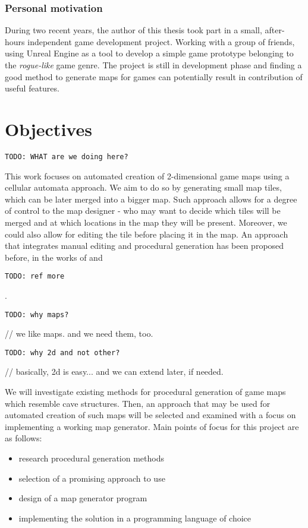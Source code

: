 \documentclass[12pt]{report}
\newcommand{\todo}[1]{}
\renewcommand{\todo}[1]{{\color{red} \par \noindent \footnotesize \texttt{TODO: {#1} }}}
\begin{document}
\subsubsection{Personal motivation}
During two recent years, the author of this thesis took part in a small, after-hours independent game development project. Working with a group of friends, using Unreal Engine as a tool to develop a simple game prototype belonging to the \textit{rogue-like} game genre. The project is still in development phase and finding a good method to generate maps for games can potentially result in contribution of useful features.

\section{Objectives}

\todo{WHAT are we doing here?}

This work focuses on automated creation of 2-dimensional game maps using a cellular automata approach. We aim to do so by generating small map tiles, which can be later merged into a bigger map. Such approach allows for a degree of control to the map designer - who may want to decide which tiles will be merged and at which locations in the map they will be present. Moreover, we could also allow for editing the tile before placing it in the map. An approach that integrates manual editing and procedural generation has been proposed before, in the works of \autocite{bidarra2010integrating} and \todo{ref more}.

\todo{why maps?}
// we like maps. and we need them, too.

\todo{why 2d and not other?} 
// basically, 2d is easy... and we can extend later, if needed.


We will investigate existing methods for procedural generation of game maps which resemble cave structures. Then, an approach that may be used for automated creation of such maps will be selected and examined with a focus on implementing a working map generator. Main points of focus for this project are as follows:

\begin{itemize}
	\item research procedural generation methods
	\item selection of a promising approach to use
	\item design of a map generator program
	\item implementing the solution in a programming language of choice
\end{itemize}
\end{document}
